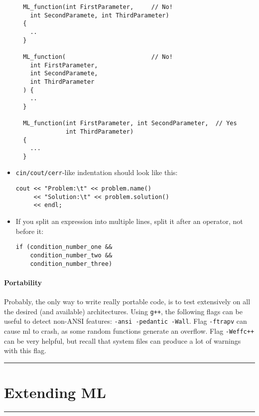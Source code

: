 \documentclass[10pt,letter,relax]{SANDreport}
\newcommand{\HRule}{\noindent\rule{\linewidth}{1mm}}
\newcommand{\ML}     {{\sc ml }}
\begin{document}
\begin{itemize}
  \begin{verbatim}
  ML_function(int FirstParameter,     // No!
    int SecondParamete, int ThirdParameter)
  {
    ..
  }

  ML_function(                        // No!
    int FirstParameter,
    int SecondParamete,
    int ThirdParameter
  ) {
    ..
  }    

  ML_function(int FirstParameter, int SecondParameter,  // Yes
              int ThirdParameter)
  {
    ...
  }      
  \end{verbatim}
\item \verb!cin/cout/cerr!-like indentation should look like this:
\begin{verbatim}
cout << "Problem:\t" << problem.name()
     << "Solution:\t" << problem.solution()
     << endl;
\end{verbatim}
\item If you split an expression into multiple lines, split it after an operator, not before it:
\begin{verbatim}
if (condition_number_one &&
    condition_number_two &&
    condition_number_three)
\end{verbatim}
\end{itemize}

\subsection{Portability}

Probably, the only way to write really portable code, is to test
extensively on all the desired (and available) architectures. Using
\verb!g++!, the following flags can be useful to detect non-ANSI
features: \verb!-ansi -pedantic -Wall!. Flag \verb!-ftrapv! can cause
\ML to crash, as some random functions generate an overflow. Flag
\verb!-Weffc++! can be very helpful, but recall that system files can
produce a lot of warnings with this flag.


\clearpage
\newpage

\vspace*{3cm}
\HRule
\part{Extending ML}

\HRule
\clearpage
\newpage
\end{document}
